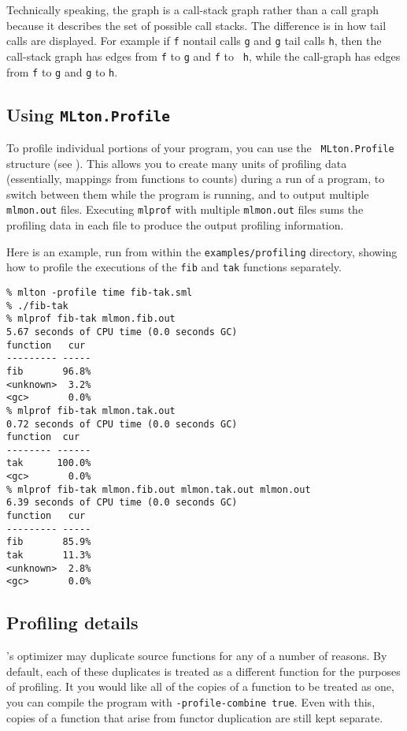 Technically speaking, the graph is a call-stack graph rather than a
call graph because it describes the set of possible call stacks.  The
difference is in how tail calls are displayed.  For example if {\tt f}
nontail calls {\tt g} and {\tt g} tail calls {\tt h}, then the
call-stack graph has edges from {\tt f} to {\tt g} and {\tt f} to {\tt
h}, while the call-graph has edges from {\tt f} to {\tt g} and {\tt g}
to {\tt h}.

\subsection{Using {\tt MLton.Profile}}

To profile individual portions of your program, you can use the {\tt
MLton.Profile} structure (see ).  This
allows you to create many units of profiling data (essentially,
mappings from functions to counts) during a run of a program, to
switch between them while the program is running, and to output
multiple {\tt mlmon.out} files.  Executing {\tt mlprof} with multiple
{\tt mlmon.out} files sums the profiling data in each file to produce
the output profiling information.

Here is an example, run from within the {\tt examples/profiling}
directory, showing how to profile the executions of the {\tt fib} and
{\tt tak} functions separately.

\begin{verbatim}
% mlton -profile time fib-tak.sml
% ./fib-tak
% mlprof fib-tak mlmon.fib.out
5.67 seconds of CPU time (0.0 seconds GC)
function   cur 
--------- -----
fib       96.8%
<unknown>  3.2%
<gc>       0.0%
% mlprof fib-tak mlmon.tak.out
0.72 seconds of CPU time (0.0 seconds GC)
function  cur  
-------- ------
tak      100.0%
<gc>       0.0%
% mlprof fib-tak mlmon.fib.out mlmon.tak.out mlmon.out
6.39 seconds of CPU time (0.0 seconds GC)
function   cur 
--------- -----
fib       85.9%
tak       11.3%
<unknown>  2.8%
<gc>       0.0%
\end{verbatim}

\subsection{Profiling details}

{\mlton}'s optimizer may duplicate source functions for any of a
number of reasons.  By default, each of these duplicates is treated as
a different function for the purposes of profiling.  It you would like
all of the copies of a function to be treated as one, you can compile
the program with {\tt -profile-combine true}.  Even with this, copies
of a function that arise from functor duplication are still kept
separate.

